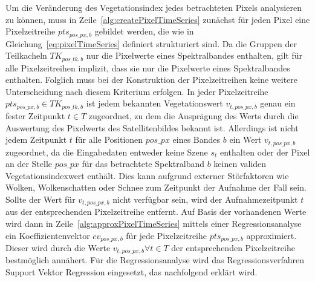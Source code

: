 %
Um die Veränderung des Vegetationsindex jedes betrachteten Pixels analysieren zu können, muss in Zeile~\ref{alg:createPixelTimeSeries} zunächst für jeden Pixel eine Pixelzeitreihe $pts_{pos\_px, b}$ gebildet werden, die wie in Gleichung~\ref{eq:pixelTimeSeries} definiert strukturiert sind. Da die Gruppen der Teilkacheln $TK_{pos\_tk, b}$ nur die Pixelwerte eines Spektralbandes enthalten, gilt für alle Pixelzeitreihen implizit, dass sie nur die Pixelwerte eines Spektralbandes enthalten. Folglich muss bei der Konstruktion der Pixelzeitreihen keine weitere Unterscheidung nach diesem Kriterium erfolgen. In jeder Pixelzeitreihe $pts_{pos\_px, b} \in TK_{pos\_tk, b}$ ist jedem bekannten Vegetationswert $v_{t, pos\_px, b}$ genau ein fester Zeitpunkt $t \in T$ zugeordnet, zu dem die Ausprägung des Werts durch die Auswertung des Pixelwerts des Satellitenbildes bekannt ist. Allerdings ist nicht jedem Zeitpunkt $t$ für alle Positionen $pos\_px$ eines Bandes $b$ ein Wert $v_{t, pos\_px, b}$ zugeordnet, da die Eingabedaten entweder keine Szene $s_t$  enthalten oder der Pixel an der Stelle $pos\_px$ für das betrachtete Spektralband $b$ keinen validen Vegetationsindexwert enthält. Dies kann aufgrund externer Störfaktoren wie Wolken, Wolkenschatten oder Schnee zum Zeitpunkt der Aufnahme der Fall sein. Sollte der Wert für $v_{t, pos\_px, b}$ nicht verfügbar sein, wird der Aufnahmezeitpunkt $t$ aus der entsprechenden Pixelzeitreihe entfernt. Auf Basis der vorhandenen Werte wird dann in Zeile~\ref{alg:approxPixelTimeSeries} mittels einer Regressionsanalyse ein Koeffizientenvektor $cv_{pos\_px, b}$  für jede Pixelzeitreihe $pts_{pos\_px, b}$ approximiert. Dieser wird durch die Werte $v_{t, pos\_px, b} \forall t \in T$ der entsprechenden Pixelzeitreihe bestmöglich annähert. Für die Regressionsanalyse wird das Regressionsverfahren Support Vektor Regression eingesetzt, das nachfolgend erklärt wird. \\

